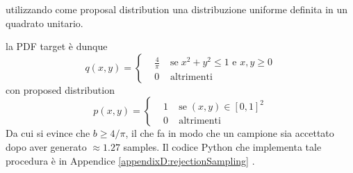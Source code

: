 utilizzando come proposal distribution una distribuzione uniforme definita in un quadrato unitario\footnotemark{}.\par
la PDF target \`e dunque 
\begin{equation}
	q(x,y) = \left\{\begin{aligned}
		&\frac{4}{\pi}\;&\mathrm{se}\;x^2+y^2\leq1\text{ e }x,y\geq0\\
		&0 &\mathrm{altrimenti}
	\end{aligned}\right.
\end{equation}
con proposed distribution 
\begin{equation}
	p(x,y) = \left\{\begin{aligned}
		&1\;&\mathrm{se}\;(x,y)\in[0,1]^2\\
		&0 &\mathrm{altrimenti}
	\end{aligned}\right.
\end{equation}
Da cui si evince che $b\geq4/\pi$, il che fa in modo che un campione sia accettato dopo aver generato $\approx1.27$ samples. Il codice Python che 
implementa tale procedura \`e in Appendice \ref{appendixD:rejectionSampling}
\label{appendixD:rejectionSampling}.
